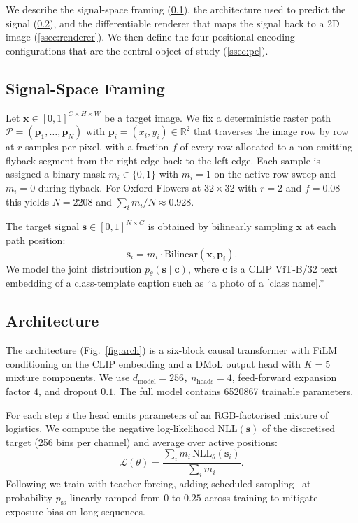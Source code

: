 \documentclass[conference,a4paper]{IEEEtran}
\begin{document}
We describe the signal-space framing
(\cref{ssec:framing}), the architecture used to predict the signal
(\cref{ssec:arch}), and the differentiable renderer that maps the
signal back to a 2D image (\cref{ssec:renderer}). We then define
the four positional-encoding configurations that are the central
object of study (\cref{ssec:pe}).

\subsection{Signal-Space Framing}\label{ssec:framing}

Let $\mathbf{x}\in[0,1]^{C\times H\times W}$ be a target image. We
fix a deterministic raster path
$\mathcal{P}=(\mathbf{p}_1,\ldots,\mathbf{p}_N)$ with
$\mathbf{p}_i=(x_i,y_i)\in\mathbb{R}^2$ that traverses the image row
by row at $r$ samples per pixel, with a fraction $f$ of every row
allocated to a non-emitting flyback segment from the right edge
back to the left edge. Each sample is assigned a binary mask
$m_i\in\{0,1\}$ with $m_i=1$ on the active row sweep and $m_i=0$
during flyback. For Oxford Flowers at $32\times32$ with $r=2$ and
$f=0.08$ this yields $N=2208$ and $\sum_i m_i / N \approx 0.928$.

The target signal $\mathbf{s}\in[0,1]^{N\times C}$ is obtained by
bilinearly sampling $\mathbf{x}$ at each path position:
\begin{equation}
  \mathbf{s}_i = m_i \cdot \mathrm{Bilinear}(\mathbf{x},\mathbf{p}_i).
\end{equation}
We model the joint distribution
$p_\theta(\mathbf{s}\mid\mathbf{c})$, where $\mathbf{c}$ is a CLIP
ViT-B/32 text embedding of a class-template caption such as
``a photo of a [class name].''

\subsection{Architecture}\label{ssec:arch}

The architecture (Fig.~\ref{fig:arch}) is a six-block causal
transformer with FiLM~\cite{perez2018film} conditioning on the CLIP
embedding and a DMoL output head with $K=5$ mixture components.
We use \textbf{$d_{\text{model}}=256$, $n_{\text{heads}}=4$},
feed-forward expansion factor $4$, and dropout $0.1$. The full model
contains \num{6520867} trainable parameters.



For each step $i$ the head emits parameters of an RGB-factorised
mixture of logistics. We compute the negative log-likelihood
$\mathrm{NLL}(\mathbf{s})$ of the discretised target (256 bins per
channel) and average over active positions:
\begin{equation}
  \mathcal{L}(\theta) = \frac{\sum_i m_i \, \mathrm{NLL}_\theta(\mathbf{s}_i)}{\sum_i m_i}.
\end{equation}
Following \cite{salimans2017pixelcnnpp} we train with teacher forcing,
adding scheduled sampling~\cite{bengio2015scheduled} at probability
$p_{\text{ss}}$ linearly ramped from 0 to $0.25$ across training to
mitigate exposure bias on long sequences.
\end{document}
